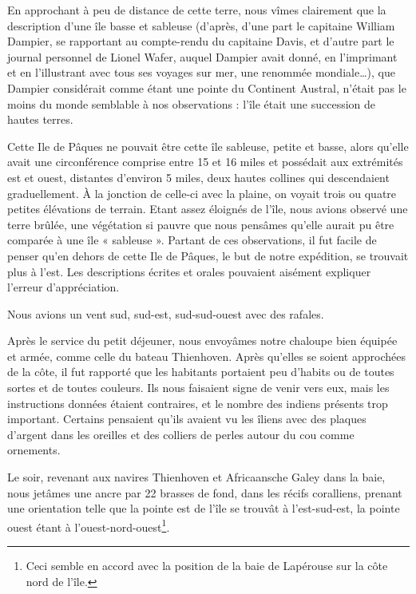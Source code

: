 \documentclass{article}
\begin{document}
        
    En approchant à peu de distance de cette terre, nous vîmes clairement que la description d'une île basse et sableuse (d'après, d'une part le capitaine William Dampier, se rapportant au compte-rendu du capitaine Davis, et d'autre part le journal personnel de Lionel Wafer, auquel Dampier avait donné, en l'imprimant et en l'illustrant avec tous ses voyages sur mer, une renommée mondiale…), que Dampier considérait comme étant une pointe du Continent Austral, n'était pas le moins du monde semblable à nos observations : l'île était une succession de hautes terres.
            
        
    Cette Ile de Pâques ne pouvait être cette île sableuse, petite et basse, alors qu'elle avait une circonférence comprise entre 15 et 16 miles et possédait aux extrémités est et ouest, distantes d'environ 5 miles, deux hautes collines qui descendaient graduellement. À la jonction de celle-ci avec la plaine, on voyait trois ou quatre petites élévations de terrain. Etant assez éloignés de l'île, nous avions observé une terre brûlée, une végétation si pauvre que nous pensâmes qu'elle aurait pu être comparée à une île « sableuse ». Partant de ces observations, il fut facile de penser qu'en dehors de cette Ile de Pâques, le but de notre expédition, se trouvait plus à l'est. Les descriptions écrites et orales pouvaient aisément expliquer l'erreur d'appréciation. 
            
        
    Nous avions un vent sud, sud-est, sud-sud-ouest avec des rafales.
            
        
    Après le service du petit déjeuner, nous envoyâmes notre chaloupe bien équipée et armée, comme celle du bateau Thienhoven. Après qu'elles se soient approchées de la côte, il fut rapporté que les habitants portaient peu d'habits ou de toutes sortes et de toutes couleurs. Ils nous faisaient signe de venir vers eux, mais les instructions données étaient contraires, et le nombre des indiens présents trop important. Certains pensaient qu'ils avaient vu les îliens avec des plaques d'argent dans les oreilles et des colliers de perles autour du cou comme ornements. 
            
        
    Le soir, revenant aux navires Thienhoven et Africaansche Galey dans la baie, nous jetâmes une ancre par 22 brasses de fond, dans les récifs coralliens, prenant une orientation telle que la pointe est de l'île se trouvât à l'est-sud-est, la pointe ouest étant à l'ouest-nord-ouest\footnote{Ceci semble en accord avec la position de la baie de Lapérouse sur la côte nord de l'île.}.
            
\end{document}
